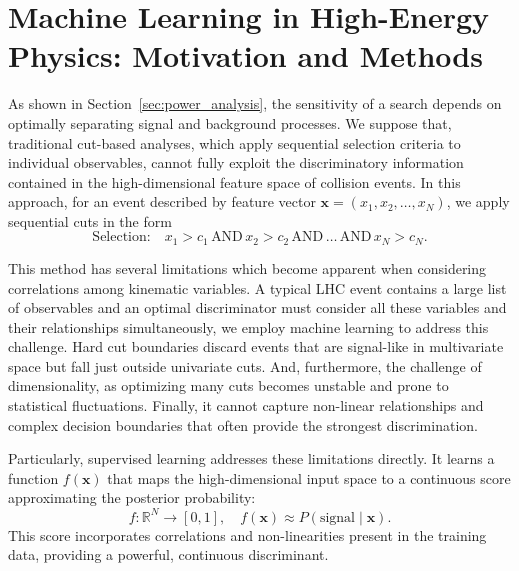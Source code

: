 \section{Machine Learning in High-Energy Physics: Motivation and Methods}
\label{sec:machine_learning}

As shown in Section~\ref{sec:power_analysis}, the sensitivity of a search depends on optimally separating signal and background processes. We suppose that, traditional cut-based analyses, which apply sequential selection criteria to individual observables, cannot fully exploit the discriminatory information contained in the high-dimensional feature space of collision events. In this approach, for an event described by feature vector $\mathbf{x} = (x_1, x_2, \ldots, x_N)$, we apply sequential cuts in the form
\begin{equation}
\text{Selection:} \quad x_1 > c_1 \,\text{AND}\, x_2 > c_2 \,\text{AND}\, \ldots \,\text{AND}\, x_N > c_N.
\end{equation}

This method has several limitations which become apparent when considering correlations among kinematic variables. A typical LHC event contains a large list of observables and an optimal discriminator must consider all these variables and their relationships simultaneously, we employ machine learning to address this challenge. Hard cut boundaries discard events that are signal-like in multivariate space but fall just outside univariate cuts. And, furthermore, the challenge of dimensionality, as optimizing many cuts becomes unstable and prone to statistical fluctuations. Finally, it cannot capture non-linear relationships and complex decision boundaries that often provide the strongest discrimination.


Particularly, supervised learning addresses these limitations directly. It learns a function $f(\mathbf{x})$ that maps the high-dimensional input space to a continuous score approximating the posterior probability:
\begin{equation}
f: \mathbb{R}^N \rightarrow [0,1], \quad f(\mathbf{x}) \approx P(\text{signal} \mid \mathbf{x}).
\end{equation}
This score incorporates correlations and non-linearities present in the training data, providing a powerful, continuous discriminant.

